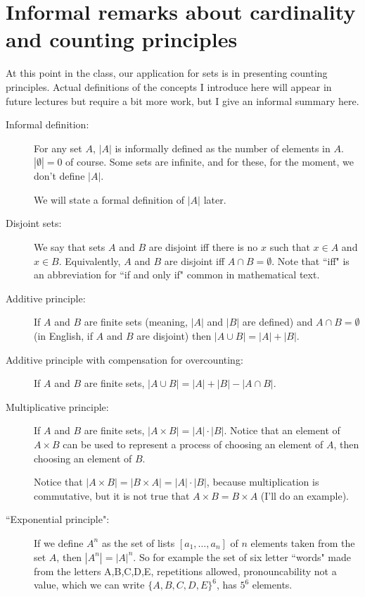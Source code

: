 \documentclass[12pt]{article}
\begin{document}
\newpage

\section{Informal remarks about cardinality and counting principles}

At this point in the class, our application for sets is in presenting counting principles.  Actual definitions of the concepts I introduce here will appear in future lectures but require a bit more work, but I give an informal summary here.

\begin{description}

\item[Informal definition:]  For any set $A$, $|A|$ is informally defined as the number of elements in $A$.
$|\emptyset|=0$ of course.  Some sets are infinite, and for these, for the moment, we don't define $|A|$.

We will state a formal definition of $|A|$ later.

\item[Disjoint sets:]  We say that sets $A$ and $B$ are disjoint iff there is no $x$ such that $x \in A$ and $x \in B$.
Equivalently, $A$ and $B$ are disjoint iff $A \cap B = \emptyset$.  Note that ``iff" is an abbreviation for ``if and only if" common in mathematical text.

\item[Additive principle:]   If $A$ and $B$ are finite sets (meaning, $|A|$ and $|B|$ are defined) and $A \cap B = \emptyset$ (in English, if $A$ and $B$ are disjoint) then $|A \cup B| = |A| + |B|$.

\item[Additive principle with compensation for overcounting:]  If $A$ and $B$ are finite sets,
$|A \cup B| = |A| + |B| - |A\cap B|$.

\item[Multiplicative principle:]  If $A$ and $B$ are finite sets, $|A \times B| = |A|\cdot |B|$.  Notice that
an element of $A \times B$ can be used to represent a process of choosing an element of $A$, then choosing an element of $B$.

Notice that $|A \times B| = |B \times A| = |A|\cdot |B|$, because multiplication is commutative, but it is not true
that $A \times B = B \times A$ (I'll do an example).

\item[``Exponential principle":]  If we define $A^n$ as the set of lists $[a_1,\ldots,a_n]$ of $n$ elements taken from the set $A$, then $|A^n| = |A|^n$.  So for example the set of six letter ``words" made from the letters A,B,C,D,E, repetitions allowed, pronouncability not a value, which we can write $\{A,B,C,D,E\}^6$, has $5^6$ elements.


\end{description}
\end{document}
